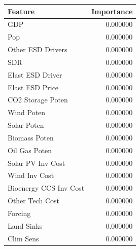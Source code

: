 \begin{tabular}{lr}
\toprule
Feature & Importance \\
\midrule
GDP & 0.000000 \\
Pop & 0.000000 \\
Other ESD Drivers & 0.000000 \\
SDR & 0.000000 \\
Elast ESD Driver & 0.000000 \\
Elast ESD Price & 0.000000 \\
CO2 Storage Poten & 0.000000 \\
Wind Poten & 0.000000 \\
Solar Poten & 0.000000 \\
Biomass Poten & 0.000000 \\
Oil Gas Poten & 0.000000 \\
Solar PV Inv Cost & 0.000000 \\
Wind Inv Cost & 0.000000 \\
Bioenergy CCS Inv Cost & 0.000000 \\
Other Tech Cost & 0.000000 \\
Forcing & 0.000000 \\
Land Sinks & 0.000000 \\
Clim Sens & 0.000000 \\
\bottomrule
\end{tabular}
